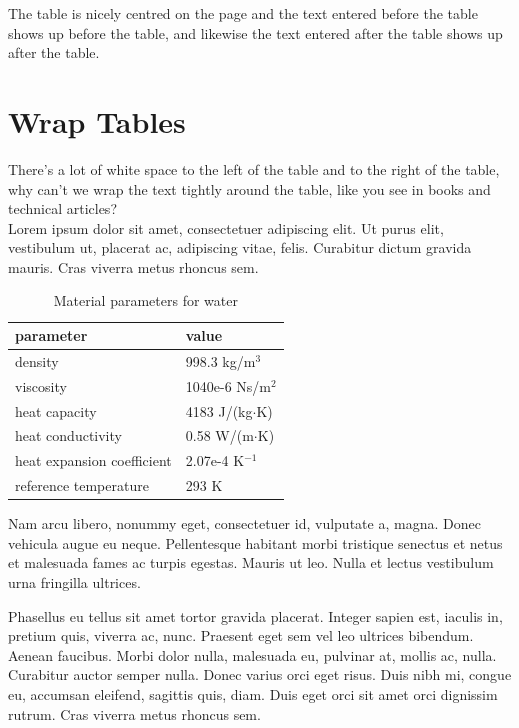 The table is nicely centred on the page and the text entered before the table shows up before the table, and likewise the text entered  after the table shows up after the table.

\section{Wrap Tables}

There's a lot of white space to the left of the table and to the right of the table, why can't we wrap the text tightly around the table,  like you see in books and technical articles?\\

Lorem ipsum dolor sit amet, consectetuer adipiscing elit. Ut purus elit, vestibulum ut, placerat ac, adipiscing vitae, felis. Curabitur dictum gravida mauris.  Cras viverra metus rhoncus sem.

\begin{table}
\caption{Material parameters for water}
\label{tb:matpar}
\centering
\begin{tabular}{ll} \hline
parameter  & value \\ \hline
density & 998.3 kg/m$^{3}$ \\
viscosity & 1040e-6 Ns/m$^{2}$ \\
heat capacity & 4183 J/(kg$\cdot$K) \\
heat conductivity & 0.58 W/(m$\cdot$K)       \\
heat expansion coefficient & 2.07e-4 K$^{-1}$      \\ 
reference temperature & 293 K       \\ \hline
\end{tabular}
\end{table}

Nam arcu libero, nonummy eget, consectetuer id, vulputate a, magna. Donec vehicula augue eu neque. Pellentesque habitant morbi tristique senectus et netus et malesuada fames ac turpis egestas. Mauris ut leo.  Nulla et lectus vestibulum urna fringilla ultrices.

Phasellus eu tellus sit amet tortor gravida placerat. Integer sapien est, iaculis in, pretium quis, viverra ac, nunc. Praesent eget sem vel leo ultrices bibendum. Aenean faucibus.  Morbi dolor nulla, malesuada eu, pulvinar at, mollis ac, nulla. Curabitur auctor semper nulla. Donec varius orci eget risus. Duis nibh mi, congue eu, accumsan eleifend, sagittis quis, diam. Duis eget orci sit amet orci dignissim rutrum.   Cras viverra metus rhoncus sem.\\

